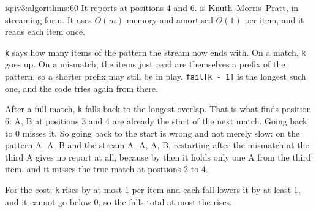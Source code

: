 \begin{solution}{iq:iv3:algorithms:60}
It reports at positions 4 and 6.  is Knuth--Morris--Pratt, in streaming form. It uses $O(m)$ memory and amortised $O(1)$ per item, and it reads each item once.
\label{lst:iv3:al:kmp}

\texttt{k} says how many items of the pattern the stream now ends with. On a match, \texttt{k} goes up. On a mismatch, the items just read are themselves a prefix of the pattern, so a shorter prefix may still be in play. \texttt{fail[k - 1]} is the longest such one, and the code tries again from there.

After a full match, \texttt{k} falls back to the longest overlap. That is what finds position 6: A, B at positions 3 and 4 are already the start of the next match. Going back to 0 misses it. So going back to the start is wrong and not merely slow: on the pattern A, A, B and the stream A, A, A, B, restarting after the mismatch at the third A gives no report at all, because by then it holds only one A from the third item, and it misses the true match at positions 2 to 4.

For the cost: \texttt{k} rises by at most 1 per item and each fall lowers it by at least 1, and it cannot go below 0, so the falls total at most the rises.

\end{solution}

